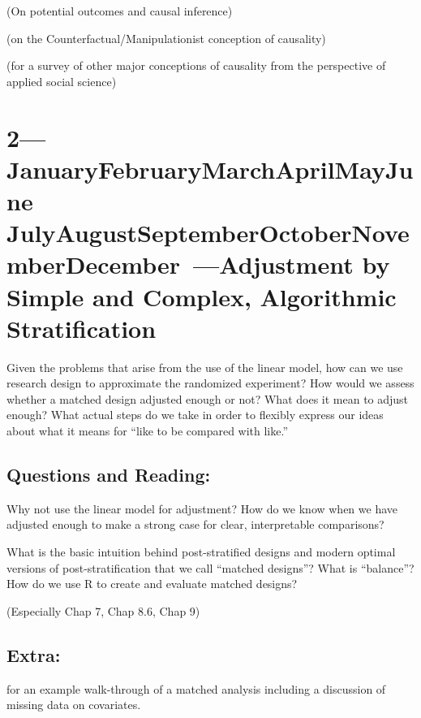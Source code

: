 \documentclass[10pt]{article}
\def\themonth{\ifcase\month\or
  January\or February\or March\or April\or May\or June\or
  July\or August\or September\or October\or November\or December\fi}
\begin{document}
\citealp[Chap 9.0 --  9.3]{gelman2007dau} (On potential outcomes and causal
inference)


\citealp[Chap 2]{angrist2009mostly}

\citealp{holland:1986a} (on the Counterfactual/Manipulationist conception of
causality)

\citealp{brady02} (for a survey of other major conceptions of causality from
the perspective of applied social science)



\AdvanceDate[1]
\section{2---\themonth~\the\day---Adjustment by Simple and Complex, Algorithmic Stratification }

Given the problems that arise from the use of the linear model, how can we use
research design to approximate the randomized experiment? How would we assess
whether a matched design adjusted enough or not? What does it mean to adjust
enough? What actual steps do we take in order to flexibly express our ideas
about what it means for ``like to be compared with like.''

\subsection{Questions and Reading:}

Why not use the linear model for adjustment? How do we know when we have
adjusted enough to make a strong case for clear, interpretable comparisons?

\citealp[Chap 6]{rosenbaum2010design}

\citealp[Chap 9.5--9.6]{gelman2007dau}

What is the basic intuition behind post-stratified designs and modern optimal
versions of post-stratification that we call ``matched designs''? What is
``balance''? How do we use R to create and evaluate matched designs?

\citealp[Chap 7--9, 13]{rosenbaum2010design} (Especially Chap 7, Chap 8.6,
Chap 9)

\subsection{Extra:}

\citealp[Chap 3]{rosenbaum2010design} 

\cite{hansen:2004a}

\cite{hansen2011qy} for an example walk-through of a matched analysis
including a discussion of missing data on covariates.
\end{document}
